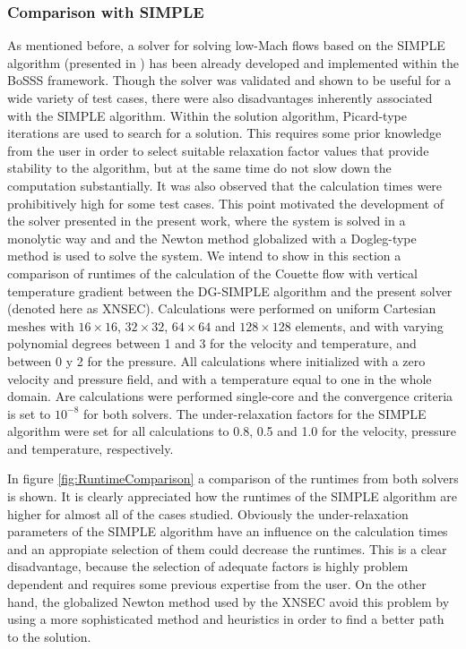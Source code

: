 \subsubsection{Comparison with SIMPLE}
As mentioned before, a solver for solving low-Mach flows based on the SIMPLE algorithm (presented in \cite{kleinHighorderDiscontinuousGalerkin2016}) has been already developed and implemented within the BoSSS framework.
Though the solver was validated and shown to be useful for a wide variety of test cases, there were also disadvantages inherently associated with the SIMPLE algorithm. Within the solution algorithm, Picard-type iterations are used to search for a solution. This requires some prior knowledge from the user in order to select suitable relaxation factor values that provide stability to the algorithm, but at the same time do not slow down the computation substantially.
It was also observed that the calculation times were prohibitively high for some test cases. This point motivated the development of the solver presented in the present work, where the system is solved in a monolytic way and  and the Newton method globalized with a Dogleg-type method is used to solve the system.
We intend to show in this section a comparison of runtimes of the calculation of the Couette flow with vertical temperature gradient between the DG-SIMPLE algorithm \citep{kleinHighorderDiscontinuousGalerkin2016} and the present solver (denoted here as XNSEC). Calculations were performed on uniform Cartesian meshes with $16\times16$, $32\times32$, $64\times64$ and $128\times128$ elements, and with varying polynomial degrees between 1 and 3 for the velocity and temperature, and between 0 y 2 for the pressure. All calculations where initialized with a zero velocity and pressure field, and with a temperature equal to one in the whole domain. Are calculations were performed single-core and the convergence criteria is set to $10^{-8}$ for both solvers. The under-relaxation factors for the SIMPLE algorithm were set for all calculations to 0.8, 0.5 and 1.0 for the velocity, pressure and temperature, respectively.

In figure \cref{fig:RuntimeComparison} a comparison of the runtimes from both solvers is shown. It is clearly  appreciated how the runtimes of the SIMPLE algorithm are higher for almost all of the cases studied. Obviously the under-relaxation parameters of the SIMPLE algorithm have an influence on the calculation times and an appropiate selection of them could decrease the runtimes. This is a clear disadvantage, because the selection of adequate factors is highly problem dependent and requires some previous expertise from the user. On the other hand, the globalized Newton method used by the XNSEC avoid this problem by using a more sophisticated method and heuristics in order to find a better path to the solution.

